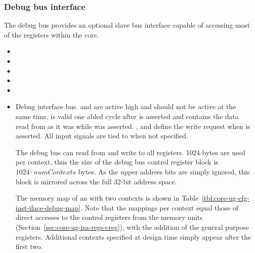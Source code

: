 
\subsubsection{Debug bus interface}
\label{sec:core-ug-cfg-inst-iface-debug}

The debug bus provides an optional slave bus interface capable of accessing most of the registers within the core.

\begin{itemize}
  
\item {}
\item {}
\item {}
\item {}
\item {}
\item {}

Debug interface bus.  and  are 
active high and should not be active at the same time.  is 
valid one abled cycle after  is asserted and 
contains the data read from  as it was while 
 was asserted. , 
 and  define the write request when 
 is asserted. All input signals are tied to  
when not specified.

The debug bus can read from and write to all \rvex{} registers. 1024 bytes are 
used per context, thus the size of the debug bus control register block is $1024 
\cdot numContexts$ bytes. As the upper address bits are simply ignored, this 
block is mirrored across the full 32-bit address space.

The memory map of an \rvex{} with two contexts is shown in 
Table~\ref{tbl:core-ug-cfg-inst-iface-debug-map}. Note that the mappings per 
context equal those of direct accesses to the control registers from the \rvex{} 
memory units (Section~\ref{sec:core-ug-isa-regs-creg}), with the addition of the 
general purpose registers. Additional contexts specified at design time simply 
appear after the first two.


\end{itemize}
